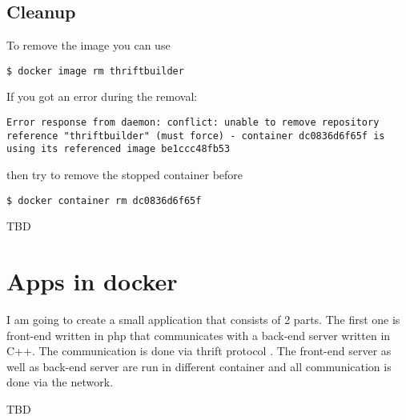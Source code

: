 \documentclass[14pt,a4paper]{article}
\begin{document}
\subsection{Cleanup}
To remove the image you can use
\begin{verbatim}
$ docker image rm thriftbuilder
\end{verbatim}
If you got an error during the removal:
\begin{verbatim}
Error response from daemon: conflict: unable to remove repository
reference "thriftbuilder" (must force) - container dc0836d6f65f is
using its referenced image be1ccc48fb53
\end{verbatim}
then try to remove the stopped container before
\begin{verbatim}
$ docker container rm dc0836d6f65f
\end{verbatim}
TBD

\section{Apps in docker}
I am going to create a small application that consists of 2 parts. The
first one is front-end written in php that communicates with a back-end server
written in C++. The communication is done via thrift protocol
\cite{apache:thrift}. The front-end server as well as back-end server
are run in different container and all communication is done via the
network. 

TBD

  
     
\end{document}
